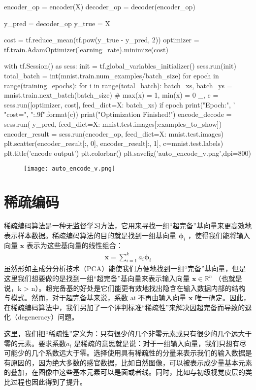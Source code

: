 \begin{python}
encoder_op = encoder(X)
decoder_op = decoder(encoder_op)

y_pred = decoder_op
y_true = X

cost = tf.reduce_mean(tf.pow(y_true - y_pred, 2))
optimizer = tf.train.AdamOptimizer(learning_rate).minimize(cost)


with tf.Session() as sess:
    init = tf.global_variables_initializer()
    sess.run(init)
    total_batch = int(mnist.train.num_examples/batch_size)
    for epoch in range(training_epochs):
        for i in range(total_batch):
            batch_xs, batch_ys = mnist.train.next_batch(batch_size)  # max(x) = 1, min(x) = 0
            _, c = sess.run([optimizer, cost], feed_dict={X: batch_xs})
        if epoch %
            print("Epoch:", '%
                  "cost=", "{:.9f}".format(c))
    print("Optimization Finished!")
    encode_decode = sess.run(
        y_pred, feed_dict={X: mnist.test.images[:examples_to_show]})
    encoder_result = sess.run(encoder_op, feed_dict={X: mnist.test.images})
    plt.scatter(encoder_result[:, 0], encoder_result[:, 1], c=mnist.test.labels)
    plt.title('encode output')
    plt.colorbar()
    plt.savefig('auto_encode_v.png',dpi=800)
\end{python}

\begin{center}
\begin{figure}[H]
\texttt{[image: auto\_encode\_v.png]}
\end{figure}
\end{center}
\section{稀疏编码}
稀疏编码算法是一种无监督学习方法，它用来寻找一组“超完备”基向量来更高效地表示样本数据。稀疏编码算法的目的就是找到一组基向量 $\mathbf{\phi}_i$ ，使得我们能将输入向量 $\mathbf{x}$ 表示为这些基向量的线性组合：
\begin{align}
\mathbf{x} = \sum_{i=1}^k a_i \mathbf{\phi}_{i} 
\end{align}
虽然形如主成分分析技术（PCA）能使我们方便地找到一组“完备”基向量，但是这里我们想要做的是找到一组“超完备”基向量来表示输入向量 $\mathbf{x}\in\mathbb{R}^n$ （也就是说，k > n）。超完备基的好处是它们能更有效地找出隐含在输入数据内部的结构与模式。然而，对于超完备基来说，系数 ai 不再由输入向量 $\mathbf{x}$ 唯一确定。因此，在稀疏编码算法中，我们另加了一个评判标准“稀疏性”来解决因超完备而导致的退化（degeneracy）问题。

这里，我们把“稀疏性”定义为：只有很少的几个非零元素或只有很少的几个远大于零的元素。要求系数$a_i$ 是稀疏的意思就是说：对于一组输入向量，我们只想有尽可能少的几个系数远大于零。选择使用具有稀疏性的分量来表示我们的输入数据是有原因的，因为绝大多数的感官数据，比如自然图像，可以被表示成少量基本元素的叠加，在图像中这些基本元素可以是面或者线。同时，比如与初级视觉皮层的类比过程也因此得到了提升。


